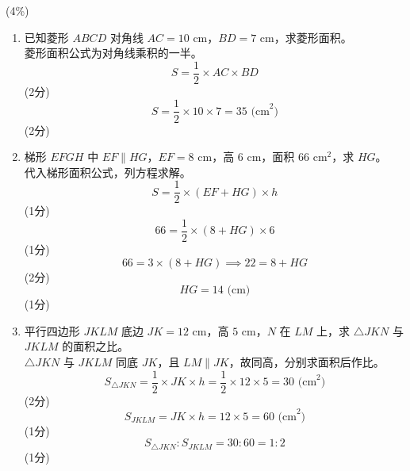 \documentclass[12pt,a4paper]{exam-zh}
\begin{document}
\begin{question}[points = 12]
\begin{enumerate}[label=(\alph*)]
        \begin{center}
        \end{center} \hfill (4\%)
    \end{enumerate}
\end{question}

\begin{solution}
    \begin{enumerate}[label=(\alph*)]
        \item 已知菱形 $ABCD$ 对角线 $AC=10\text{ cm}$，$BD=7\text{ cm}$，求菱形面积。 \\
        菱形面积公式为对角线乘积的一半。
        \[
            S = \frac{1}{2}\times AC \times BD
        \]
        \hfill (2分)
        \[
            S = \frac{1}{2}\times10\times7 = 35 \text{ (cm}^2\text{)}
        \]
        \hfill (2分)

        \item 梯形 $EFGH$ 中 $EF\parallel HG$，$EF=8\text{ cm}$，高 $6\text{ cm}$，面积 $66\text{ cm}^2$，求 $HG$。 \\
        代入梯形面积公式，列方程求解。
        \[
            S = \frac{1}{2}\times(EF+HG)\times h
        \]
        \hfill (1分)
        \[
            66 = \frac{1}{2}\times(8+HG)\times6
        \]
        \hfill (1分)
        \[
            66 = 3\times(8+HG) \implies 22 = 8+HG
        \]
        \hfill (2分)
        \[
            HG = 14 \text{ (cm)}
        \]
        \hfill (1分)

        \item 平行四边形 $JKLM$ 底边 $JK=12\text{ cm}$，高 $5\text{ cm}$，$N$ 在 $LM$ 上，求 $\triangle JKN$ 与 $JKLM$ 的面积之比。 \\
        $\triangle JKN$ 与 $JKLM$ 同底 $JK$，且 $LM\parallel JK$，故同高，分别求面积后作比。
        \[
            S_{\triangle JKN} = \frac{1}{2}\times JK\times h = \frac{1}{2}\times12\times5 = 30 \text{ (cm}^2\text{)}
        \]
        \hfill (2分)
        \[
            S_{JKLM} = JK\times h = 12\times5 = 60 \text{ (cm}^2\text{)}
        \]
        \hfill (1分)
        \[
            S_{\triangle JKN} : S_{JKLM} = 30:60 = 1:2
        \]
        \hfill (1分)
    \end{enumerate}
\end{solution}
\newpage
\end{document}
